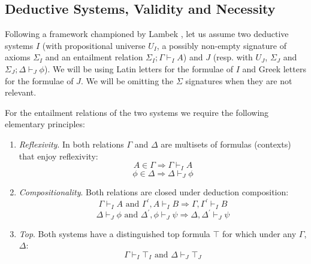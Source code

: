 \subsection{Deductive Systems, Validity and Necessity}
Following a framework championed by Lambek \cite{lambek1968deductive,lambek1969deductive}, let us  assume two deductive systems $I$ 
(with propositional universe $U_I$, 
a possibly non-empty signature of axioms $\Sigma_I$ and an entailment relation $\Sigma_I;\Gamma\vdash_{I}A$) and $J$ 
(resp. with  $U_J$, $\Sigma_J$ and $\Sigma_J;\Delta\vdash_J \phi$). We will be using Latin letters for the formulae of $I$ and Greek letters for the formulae of $J$.
We will be omitting the $\Sigma$ signatures when they are not relevant.

For the  entailment relations of the two systems we require the following elementary principles:
\begin{enumerate}
	\item \textit{Reflexivity}. In both relations $\Gamma$ and $\Delta$ are multisets of formulas (contexts) that enjoy reflexivity:
	$$A \in \Gamma \Longrightarrow \Gamma\vdash_{I}A$$ $$\phi \in \Delta \Longrightarrow \Delta\vdash_{J}\phi$$
	\item \textit{Compositionality}.  Both relations are closed under deduction composition:  
	$$\Gamma\vdash_I A \text{\ and\ } \Gamma^{'},A\vdash_{I} B \Longrightarrow \Gamma,\Gamma^{'}\vdash_I B $$  
	$$\Delta\vdash_J\phi \text{\ and\ } \Delta^{'},\phi\vdash_{J} \psi \Longrightarrow \Delta,\Delta^{'}\vdash_J \psi$$ 
	\item \textit{Top}. Both systems have a distinguished top formula $\top$ for which under any $\Gamma$, $\Delta$: $$\Gamma\vdash_{I}\top_I \text{\ and \ }
	\Delta \vdash_J\top_J$$
\end{enumerate}

